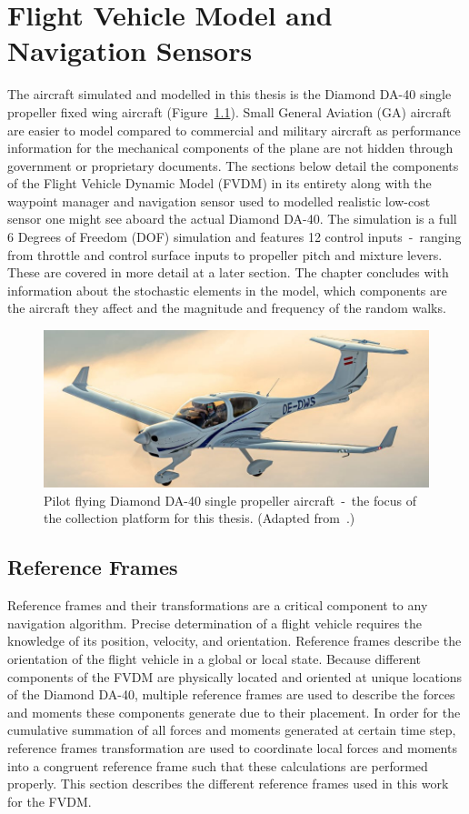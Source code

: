 \documentclass[12pt]{report}
\begin{document}
\chapter{Flight Vehicle Model and Navigation Sensors}
The aircraft simulated and modelled in this thesis is the Diamond DA-40 single propeller fixed wing aircraft (Figure~\ref{fig:DA40}). Small General Aviation (GA) aircraft are easier to model compared to commercial and military aircraft as performance information for the mechanical components of the plane are not hidden through government or proprietary documents. The sections below detail the components of the Flight Vehicle Dynamic Model (FVDM) in its entirety along with the waypoint manager and navigation sensor used to modelled realistic low-cost sensor one might see aboard the actual Diamond DA-40. The simulation is a full 6 Degrees of Freedom (DOF) simulation and features 12 control inputs~-~ranging from throttle and control surface inputs to propeller pitch and mixture levers. These are covered in more detail at a later section. The chapter concludes with information about the stochastic elements in the model, which components are the aircraft they affect and the magnitude and frequency of the random walks.

\begin{figure}[!ht]\label{fig:DA40}
  \centering
  \includegraphics[width=.85\linewidth]{Figures/DA40.jpg}
  \caption{Pilot flying Diamond DA-40 single propeller aircraft~-~the focus of the collection platform for this thesis. (Adapted from~\cite{DiamondAircraftDA40}.)}
\end{figure}
\clearpage
\section{Reference Frames}
Reference frames and their transformations are a critical component to any navigation algorithm. Precise determination of a flight vehicle requires the knowledge of its position, velocity, and orientation. Reference frames describe the orientation of the flight vehicle in a global or local state. Because different components of the FVDM are physically located and oriented at unique locations of the Diamond DA-40, multiple reference frames are used to describe the forces and moments these components generate due to their placement. In order for the cumulative summation of all forces and moments generated at certain time step, reference frames transformation are used to coordinate local forces and moments into a congruent reference frame such that these calculations are performed properly. This section describes the different reference frames used in this work for the FVDM\@.
\end{document}
